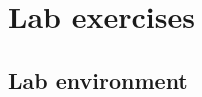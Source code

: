 \documentclass[a4paper]{article}
\begin{document}

\section{Lab exercises}

\subsection{Lab environment}
\end{document}
